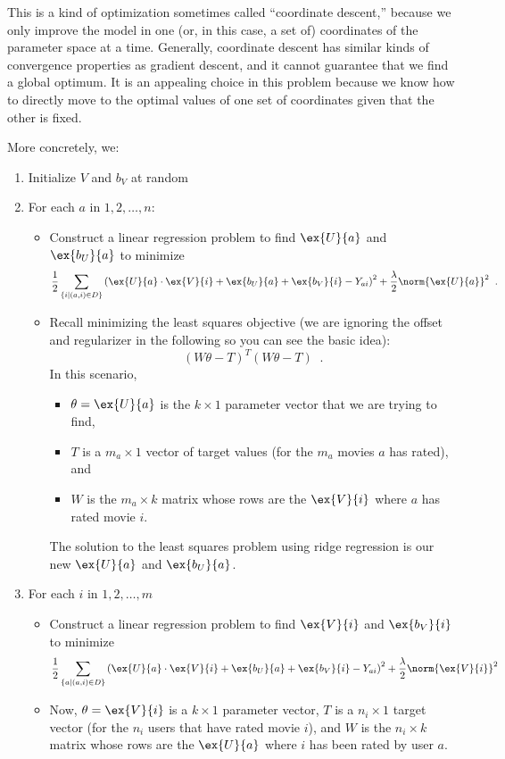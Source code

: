 This is a kind of optimization sometimes called ``coordinate
descent,''  because we only improve the model in one (or, in this
case, a set of) coordinates of the parameter space at a time.
Generally, coordinate descent has similar kinds of convergence
properties as gradient descent, and it cannot guarantee that we find a
global optimum.  It is an appealing choice in this problem because we
know how to directly move to the optimal values of one set of
coordinates given that the other is fixed.

\vspace*{0.3cm}
\noindent More concretely, we:
\begin{enumerate}
  \item Initialize $V$ and $b_V$ at random
  \item For each $a$ in $1, 2, \ldots, n$:
    \begin{itemize}
      \item Construct a linear regression problem to find $\ex{U}{a}$ and $\ex{b_U}{a}$
        to minimize
        \[\frac{1}{2}\sum_{\{i \mid (a,i) \in D\}}
          \left(\ex{U}{a}\cdot \ex{V}{i} + \ex{b_U}{a} + \ex{b_V}{i}
          - Y_{ai}\right)^2 + \frac{\lambda}{2}\norm{\ex{U}{a}}^2
        \;\;.\]
      \item Recall minimizing the least squares objective (we are
        ignoring the offset and regularizer in the following so you
        can see the basic idea):
        \[(W\theta - T)^T(W\theta - T)\;\;.\]
        In this scenario, 
        \begin{itemize}
        \item $\theta = \ex{U}{a}$ is the $k \times 1$ parameter
          vector that we are trying to find,
        \item $T$ is a $m_a \times 1$ vector of target values
        (for the $m_a$ movies $a$ has rated), and 
        \item  $W$ is the $m_a \times k$ matrix whose rows are the $\ex{V}{i}$
        where $a$ has rated movie $i$.
        \end{itemize}
        The solution to the least squares problem using ridge
        regression is our new  $\ex{U}{a}$ and $\ex{b_U}{a}$.
    \end{itemize}
  \item For each $i$ in $1, 2, \ldots, m$
    \begin{itemize}
      \item Construct a linear regression problem to find $\ex{V}{i}$
        and $\ex{b_V}{i}$
        to minimize
        \[\frac{1}{2}\sum_{\{a \mid (a,i) \in D\}}
          \left(\ex{U}{a}\cdot \ex{V}{i} + \ex{b_U}{a} + \ex{b_V}{i}
          - Y_{ai}\right)^2 + \frac{\lambda}{2}\norm{\ex{V}{i}}^2
        \]
      \item Now, $\theta = \ex{V}{i}$ is a $k \times 1$
        parameter vector, $T$ is a $n_i \times 1$ target vector
        (for the $n_i$ users that have rated movie $i$), and $W$ is
        the $n_i \times k$ matrix whose rows are the $\ex{U}{a}$
        where $i$ has been rated by user $a$.


\end{itemize}
\end{enumerate}
